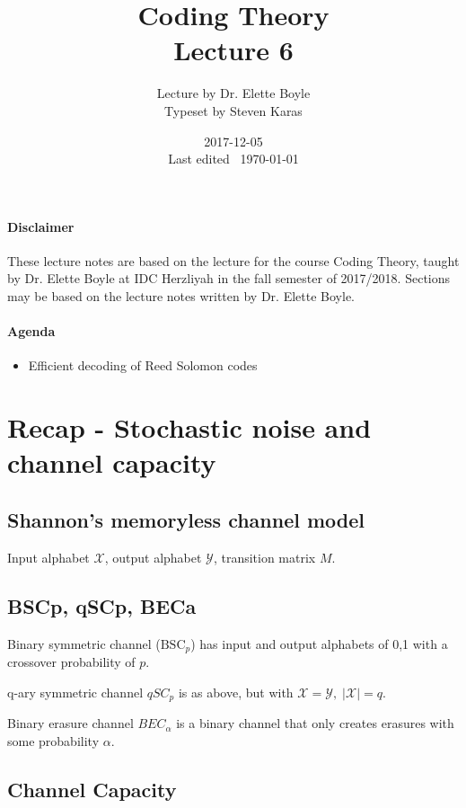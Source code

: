 \documentclass{idc_msc}
\title{Coding Theory\\\large Lecture 6}
\date{2017-12-05 \\ Last edited \currenttime\ \today}
\author{Lecture by Dr. Elette Boyle\\Typeset by Steven Karas}
\newcommand{\BSC}[1][p]{{\text{BSC}_{#1}}}
\begin{document}
\maketitle

\paragraph{Disclaimer}

These lecture notes are based on the lecture for the course Coding Theory, taught by Dr. Elette Boyle at IDC Herzliyah in the fall semester of 2017/2018.
Sections may be based on the lecture notes written by Dr. Elette Boyle.

\paragraph{Agenda}

\begin{itemize}
  \item Efficient decoding of Reed Solomon codes
\end{itemize}

\section{Recap - Stochastic noise and channel capacity}

\subsection{Shannon's memoryless channel model}

Input alphabet \(\mathcal{X}\), output alphabet \(\mathcal{Y}\), transition matrix \(M\).

\subsection{BSCp, qSCp, BECa}

Binary symmetric channel (\(\BSC\)) has input and output alphabets of 0,1 with a crossover probability of \(p\).

q-ary symmetric channel \(qSC_p\) is as above, but with \(\mathcal{X} = \mathcal{Y},\; |\mathcal{X}| = q\).

Binary erasure channel \(BEC_{\alpha}\) is a binary channel that only creates erasures with some probability \(\alpha\).

\subsection{Channel Capacity}
\end{document}
